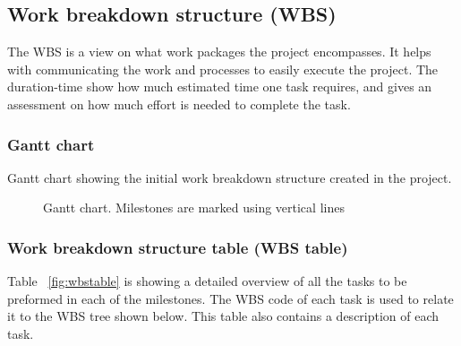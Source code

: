 \subsection{Work breakdown structure (WBS)}
The WBS is a view on what work packages the project encompasses. It helps with communicating the work and processes to easily execute the project. The duration-time show how much estimated time one task requires, and gives an assessment on how much effort is needed to complete the task.

\subsubsection{Gantt chart}
Gantt chart showing the initial work breakdown structure created in the project.
\begin{figure}[H]
\caption{Gantt chart. Milestones are marked using vertical lines}
\end{figure}

\subsubsection{Work breakdown structure table (WBS table)}
Table ~\ref{fig:wbstable} is showing a detailed overview of all the tasks to be preformed in each of the milestones. The WBS code of each task is used to relate it to the WBS tree shown below. This table also contains a description of each task.



